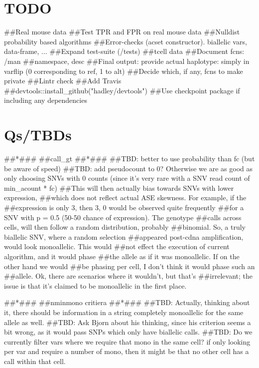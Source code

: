 

\section{TODO}
##Real mouse data
##Test TPR and FPR on real mouse data
##Nulldist probability based algorithms
##Error-checks (acset constructor). biallelic vars, data-frame, ...
##Expand test-suite (/tests)
##tcell data
##Document fcns: /man
##namespace, desc
##Final output: provide actual haplotype: simply in varflip (0
corresponding to ref, 1 to alt)
##Decide which, if any, fcns to make private
##Lintr check
##Add Travis
##devtools::install_github("hadley/devtools")
##Use checkpoint package if including any dependencies

\section{Qs/TBDs}

##*###
##call_gt
##*###
##TBD: better to use probability than fc (but be aware of speed)
##TBD: add pseudocount to 0? Otherwise we are as good as only choosing SNVs with 0 counts (since it's very rare with a SNV read count of min_acount * fc)
##This will then actually bias towards SNVs with lower expression,
##which does not reflect actual ASE skewness. For example, if the
##expression is only 3, then {3, 0} would be observed quite frequently
##for a SNV with p = 0.5 (50-50 chance of expression). The genotype
##calls across cells, will then follow a random distribution, probably
##binomial. So, a truly biallelic SNV, where a random selection
##appeared post-cdna amplification, would look monoallelic. This would
##not effect the execution of current algorithm, and it would phase
##the allele as if it was monoallelic. If on the other hand we would
##be phasing per cell, I don't think it would phase such an
##allele. Ok, there are scenarios where it wouldn't, but that's
##irrelevant; the issue is that it's claimed to be monoallelic in the first place.

##*###
##nminmono critiera
##*###
##TBD: Actually, thinking about it, there should be information in a string completely monoallelic for the same allele as well.
##TBD: Ask Bjorn about his thinking, since his criterion seems a bit wrong, as it would pass SNPs which only have biallelic calls.
##TBD: Do we currently filter vars where we require that mono in the
same cell? if only looking per var and require a number of mono, then
it might be that no other cell has a call within that cell.


